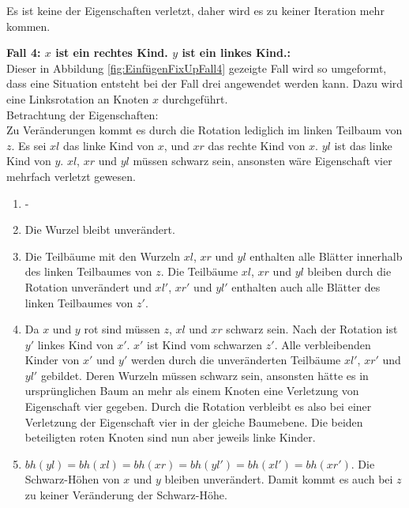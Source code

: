 \documentclass[a4paper,12pt]{article}
\begin{document}
\noindent Es ist keine der Eigenschaften verletzt, daher wird es zu keiner Iteration mehr kommen.


\noindent\textbf{Fall 4: $x$ ist ein rechtes Kind. $y$ ist ein linkes Kind.: }\\      
Dieser in Abbildung \ref{fig:EinfügenFixUpFall4} gezeigte Fall wird so umgeformt, dass eine Situation entsteht bei der Fall drei angewendet werden kann. Dazu wird eine Linksrotation an Knoten $x$ durchgeführt.\\

\noindent Betrachtung der Eigenschaften:\\
Zu Veränderungen kommt es durch die Rotation lediglich im linken Teilbaum von $z$. Es sei $\mathit{xl}$ das linke Kind von $x$,  und $\mathit{xr}$ das rechte Kind von $x$. $\mathit{yl}$ ist das linke Kind von $y$. $\mathit{xl}$, $\mathit{xr}$ und $\mathit{yl}$ müssen schwarz sein, ansonsten wäre Eigenschaft vier mehrfach verletzt gewesen.
\begin{enumerate}
	\item -
	\item Die Wurzel bleibt unverändert.
	\item  Die Teilbäume mit den Wurzeln $\mathit{xl}$, $\mathit{xr}$ und $\mathit{yl}$ enthalten alle Blätter innerhalb des linken Teilbaumes von $z$. Die Teilbäume  $\mathit{xl}$, $\mathit{xr}$ und $\mathit{yl}$ bleiben durch die Rotation unverändert und $\mathit{xl'}$, $\mathit{xr'}$ und $\mathit{yl'}$ enthalten auch alle Blätter des linken Teilbaumes von $z'$.
	\item Da $x$ und $y$ rot sind müssen $z$, $\mathit{xl}$ und $\mathit{xr}$ schwarz sein. Nach der Rotation ist $y'$ linkes Kind von $x'$. $x'$ ist Kind vom schwarzen $z'$. Alle verbleibenden Kinder von $x'$ und $y'$ werden durch die unveränderten Teilbäume $\mathit{xl'}$, $\mathit{xr'}$ und $\mathit{yl'}$ gebildet. Deren Wurzeln müssen schwarz sein, ansonsten hätte es in ursprünglichen Baum an mehr als einem Knoten eine Verletzung von Eigenschaft vier gegeben. Durch die Rotation verbleibt es also bei einer Verletzung der Eigenschaft vier in der gleiche Baumebene. Die beiden beteiligten roten Knoten sind nun aber jeweils linke Kinder.   
	\item $ \mathit{bh(yl)} = \mathit{bh(xl)} = \mathit{bh(xr)} = \mathit{bh(yl')} = \mathit{bh(xl')} = \mathit{bh(xr')} $. Die Schwarz-Höhen von $x$ und $y$ bleiben unverändert. Damit kommt es auch bei $z$ zu keiner Veränderung der Schwarz-Höhe. 
\end{enumerate}  
\end{document}
